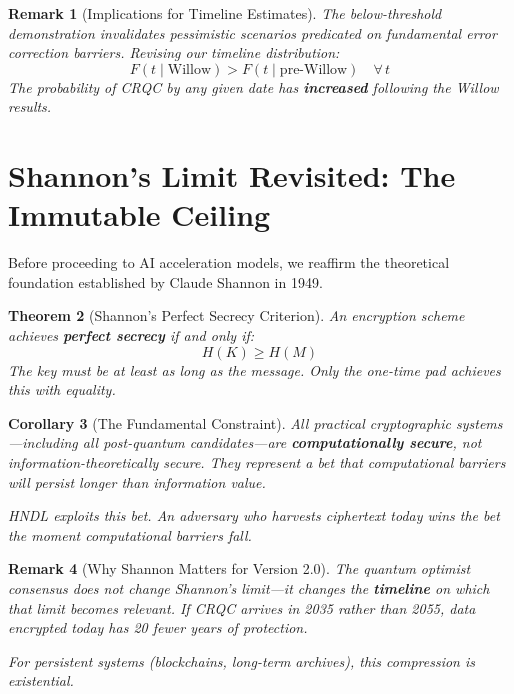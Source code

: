 \documentclass[11pt,a4paper]{article}
\newtheorem{theorem}{Theorem}[section]
\newtheorem{corollary}[theorem]{Corollary}
\newtheorem{remark}[theorem]{Remark}
\begin{document}
\begin{remark}[Implications for Timeline Estimates]
The below-threshold demonstration invalidates pessimistic scenarios predicated on fundamental error correction barriers. Revising our timeline distribution:
\begin{equation}
F(t \mid \text{Willow}) > F(t \mid \text{pre-Willow}) \quad \forall\, t
\end{equation}
The probability of CRQC by any given date has \textbf{increased} following the Willow results.
\end{remark}

\section{Shannon's Limit Revisited: The Immutable Ceiling}

Before proceeding to AI acceleration models, we reaffirm the theoretical foundation established by Claude Shannon in 1949.

\begin{theorem}[Shannon's Perfect Secrecy Criterion]
An encryption scheme achieves \textbf{perfect secrecy} if and only if:
\begin{equation}
H(K) \geq H(M)
\end{equation}
The key must be at least as long as the message. Only the one-time pad achieves this with equality.
\end{theorem}

\begin{corollary}[The Fundamental Constraint]
All practical cryptographic systems---including all post-quantum candidates---are \textbf{computationally secure}, not information-theoretically secure. They represent a bet that computational barriers will persist longer than information value.

HNDL exploits this bet. An adversary who harvests ciphertext today wins the bet the moment computational barriers fall.
\end{corollary}

\begin{remark}[Why Shannon Matters for Version 2.0]
The quantum optimist consensus does not change Shannon's limit---it changes the \textbf{timeline} on which that limit becomes relevant. If CRQC arrives in 2035 rather than 2055, data encrypted today has 20 fewer years of protection.

For persistent systems (blockchains, long-term archives), this compression is existential.
\end{remark}
\end{document}
